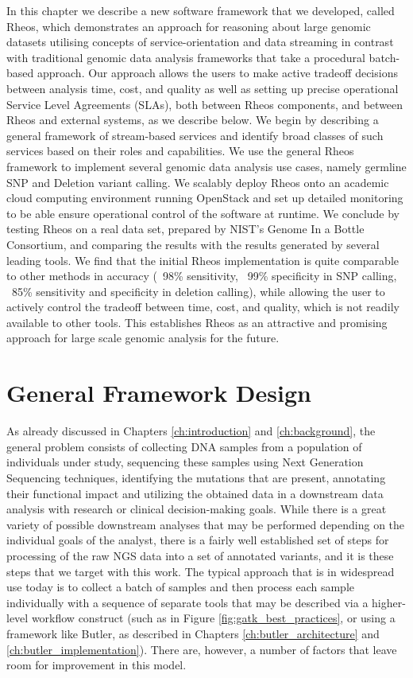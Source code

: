 In this chapter we describe a new software framework that we developed, called Rheos, which demonstrates an approach for reasoning about large genomic datasets utilising concepts of service-orientation and data streaming in contrast with traditional genomic data analysis frameworks\autocite{depristo2011framework} that take a procedural batch-based approach. Our approach allows the users to make active tradeoff decisions between analysis time, cost, and quality as well as setting up precise operational Service Level Agreements (SLAs), both between Rheos components, and between Rheos and external systems, as we describe below. We begin by describing a general framework of stream-based services and identify broad classes of such services based on their roles and capabilities. We use the general Rheos framework to implement several genomic data analysis use cases, namely germline SNP and Deletion variant calling. We scalably deploy Rheos onto an academic cloud computing environment running OpenStack and set up detailed monitoring to be able ensure operational control of the software at runtime. We conclude by testing Rheos on a real data set, prepared by NIST's Genome In a Bottle Consortium, and comparing the results with the results generated by several leading tools. We find that the initial Rheos implementation is quite comparable to other methods in accuracy (~98\% sensitivity, ~99\% specificity in SNP calling, ~85\% sensitivity and specificity in deletion calling), while allowing the user to actively control the tradeoff between time, cost, and quality, which is not readily available to other tools. This establishes Rheos as an attractive and promising approach for large scale genomic analysis for the future. 

\section{General Framework Design}\label{sec:rheos_general_framework_design}

As already discussed in Chapters \ref{ch:introduction} and \ref{ch:background}, the general problem consists of collecting DNA samples from a population of individuals under study, sequencing these samples using Next Generation Sequencing techniques, identifying the mutations that are present, annotating their functional impact and utilizing the obtained data in a downstream data analysis with research or clinical decision-making goals. While there is a great variety of possible downstream analyses that may be performed depending on the individual goals of the analyst, there is a fairly well established set of steps for processing of the raw NGS data into a set of annotated variants, and it is these steps that we target with this work. The typical approach that is in widespread use today is to collect a batch of samples and then process each sample individually with a sequence of separate tools that may be described via a higher-level workflow construct (such as in Figure \ref{fig:gatk_best_practices}, or using a framework like Butler, as described in Chapters \ref{ch:butler_architecture} and \ref{ch:butler_implementation}). There are, however, a number of factors that leave room for improvement in this model. 


